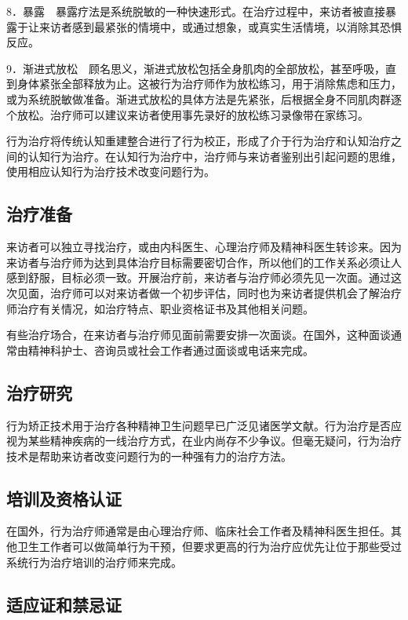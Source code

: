 8．暴露　暴露疗法是系统脱敏的一种快速形式。在治疗过程中，来访者被直接暴露于让来访者感到最紧张的情境中，或通过想象，或真实生活情境，以消除其恐惧反应。

9．渐进式放松　顾名思义，渐进式放松包括全身肌肉的全部放松，甚至呼吸，直到身体紧张全部释放为止。这被行为治疗师作为放松练习，用于消除焦虑和压力，或为系统脱敏做准备。渐进式放松的具体方法是先紧张，后根据全身不同肌肉群逐个放松。治疗师可以建议来访者使用事先录好的放松练习录像带在家练习。

行为治疗将传统认知重建整合进行了行为校正，形成了介于行为治疗和认知治疗之间的认知行为治疗。在认知行为治疗中，治疗师与来访者鉴别出引起问题的思维，使用相应认知行为治疗技术改变问题行为。

\subsection{治疗准备}

来访者可以独立寻找治疗，或由内科医生、心理治疗师及精神科医生转诊来。因为来访者与治疗师为达到具体治疗目标需要密切合作，所以他们的工作关系必须让人感到舒服，目标必须一致。开展治疗前，来访者与治疗师必须先见一次面。通过这次见面，治疗师可以对来访者做一个初步评估，同时也为来访者提供机会了解治疗师治疗有关情况，如治疗特点、职业资格证书及其他相关问题。

有些治疗场合，在来访者与治疗师见面前需要安排一次面谈。在国外，这种面谈通常由精神科护士、咨询员或社会工作者通过面谈或电话来完成。

\subsection{治疗研究}

行为矫正技术用于治疗各种精神卫生问题早已广泛见诸医学文献。行为治疗是否应视为某些精神疾病的一线治疗方式，在业内尚存不少争议。但毫无疑问，行为治疗技术是帮助来访者改变问题行为的一种强有力的治疗方法。

\subsection{培训及资格认证}

在国外，行为治疗师通常是由心理治疗师、临床社会工作者及精神科医生担任。其他卫生工作者可以做简单行为干预，但要求更高的行为治疗应优先让位于那些受过系统行为治疗培训的治疗师来完成。

\subsection{适应证和禁忌证}

